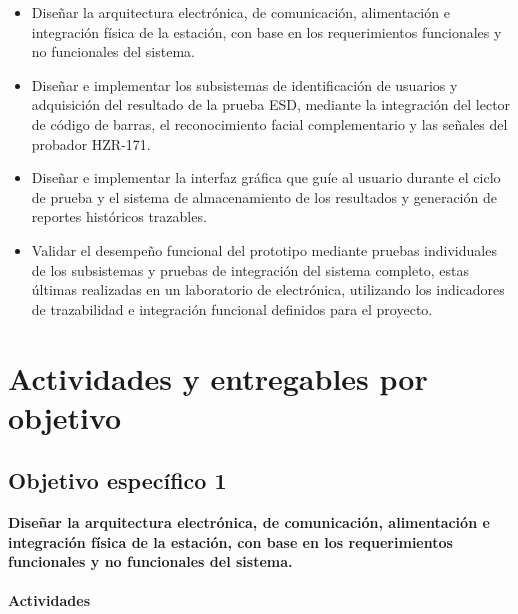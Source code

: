 \begin{itemize}

\item Diseñar la arquitectura electrónica, de comunicación, alimentación e 
integración física de la estación, con base en los requerimientos 
funcionales y no funcionales del sistema.

\item Diseñar e implementar los subsistemas de identificación de usuarios y
adquisición del resultado de la prueba ESD, mediante la integración del lector
de código de barras, el reconocimiento facial complementario y las señales del
probador HZR-171.

\item Diseñar e implementar la interfaz gráfica que guíe al usuario durante el
ciclo de prueba y el sistema de almacenamiento de los resultados y generación
de reportes históricos trazables.

\item Validar el desempeño funcional del prototipo mediante pruebas individuales
de los subsistemas y pruebas de integración del sistema completo, estas últimas
realizadas en un laboratorio de electrónica, utilizando los indicadores de
trazabilidad e integración funcional definidos para el proyecto.

\end{itemize}

\section{Actividades y entregables por objetivo}

\subsection{Objetivo específico 1}

\textbf{Diseñar la arquitectura electrónica, de comunicación, alimentación e 
integración física de la estación, con base en los 
requerimientos funcionales y no funcionales del sistema.}

\paragraph{Actividades}

